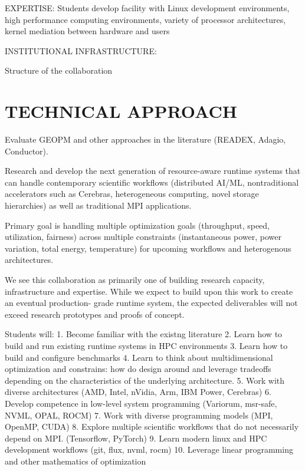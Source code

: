 \documentclass[11pt]{article}
\begin{document}
EXPERTISE:
Students develop facility with Linux development environments, high performance
computing environments, variety of processor architectures, kernel mediation between
hardware and users

INSTITUTIONAL INFRASTRUCTURE:

Structure of the collaboration

\section{TECHNICAL APPROACH}
Evaluate GEOPM and other approaches in the literature (READEX, Adagio, Conductor).

Research and develop the next generation of resource-aware runtime systems that
can handle contemporary scientific workflows (distributed AI/ML, nontraditional
accelerators such as Cerebras, heterogeneous computing, novel storage hierarchies) 
as well as traditional MPI applications.

Primary goal is handling multiple optimization goals (throughput, speed, utilization,
fairness) across multiple constraints (instantaneous power, power variation, total energy, 
temperature) for upcoming workflows and heterogenous architectures.

We see this collaboration as primarily one of building research capacity, infrastructure
and expertise.  While we expect to build upon this work to create an eventual production-
grade runtime system, the expected deliverables will not exceed research prototypes and
proofs of concept.  

Students will:
1. Become familiar with the existng literature
2. Learn how to build and run existing runtime systems in HPC environments
3. Learn how to build and configure benchmarks
4. Learn to think about multidimensional optimization and constrains:
how do design around and leverage tradeoffs depending on the characteristics of the
underlying architecture.
5. Work with diverse architectures (AMD, Intel, nVidia, Arm, IBM Power, Cerebras)
6. Develop competence in low-level system programming (Variorum, msr-safe, NVML, OPAL, ROCM)
7. Work with diverse programming models (MPI, OpenMP, CUDA)
8. Explore multiple scientific workflows that do not necessarily depend on MPI. (Tensorflow, PyTorch)
9. Learn modern linux and HPC development workflows (git, flux, nvml, rocm)
10. Leverage linear programming and other mathematics of optimization
\end{document}
